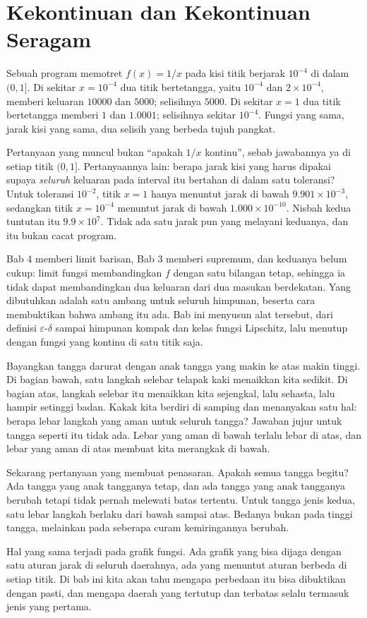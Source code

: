 \chapter{Kekontinuan dan Kekontinuan Seragam}

Sebuah program memotret $f(x)=1/x$ pada kisi titik berjarak $10^{-4}$ di dalam
$(0,1]$. Di sekitar $x=10^{-4}$ dua titik bertetangga, yaitu $10^{-4}$ dan
$2\times 10^{-4}$, memberi keluaran $10000$ dan $5000$; selisihnya $5000$. Di sekitar
$x=1$ dua titik bertetangga memberi $1$ dan $1.0001$; selisihnya sekitar $10^{-4}$.
Fungsi yang sama, jarak kisi yang sama, dua selisih yang berbeda tujuh pangkat.

Pertanyaan yang muncul bukan ``apakah $1/x$ kontinu'', sebab jawabannya ya di setiap
titik $(0,1]$. Pertanyaannya lain: berapa jarak kisi yang harus dipakai supaya
\emph{seluruh} keluaran pada interval itu bertahan di dalam satu toleransi? Untuk
toleransi $10^{-2}$, titik $x=1$ hanya menuntut jarak di bawah
$9.901\times 10^{-3}$, sedangkan titik $x=10^{-4}$ menuntut jarak di bawah
$1.000\times 10^{-10}$. Nisbah kedua tuntutan itu $9.9\times 10^{7}$. Tidak ada satu
jarak pun yang melayani keduanya, dan itu bukan cacat program.

Bab 4 memberi limit barisan, Bab 3 memberi supremum, dan keduanya belum cukup: limit
fungsi membandingkan $f$ dengan satu bilangan tetap, sehingga ia tidak dapat
membandingkan dua keluaran dari dua masukan berdekatan. Yang dibutuhkan adalah satu
ambang untuk seluruh himpunan, beserta cara membuktikan bahwa ambang itu ada. Bab ini
menyusun alat tersebut, dari definisi $\varepsilon$-$\delta$ sampai himpunan kompak dan
kelas fungsi Lipschitz, lalu menutup dengan fungsi yang kontinu di satu titik saja.

\begin{untukanak}
Bayangkan tangga darurat dengan anak tangga yang makin ke atas makin tinggi. Di
bagian bawah, satu langkah selebar telapak kaki menaikkan kita sedikit. Di bagian
atas, langkah selebar itu menaikkan kita sejengkal, lalu sehasta, lalu hampir
setinggi badan. Kakak kita berdiri di samping dan menanyakan satu hal: berapa lebar
langkah yang aman untuk seluruh tangga? Jawaban jujur untuk tangga seperti itu tidak
ada. Lebar yang aman di bawah terlalu lebar di atas, dan lebar yang aman di atas
membuat kita merangkak di bawah.

Sekarang pertanyaan yang membuat penasaran. Apakah semua tangga begitu? Ada tangga
yang anak tangganya tetap, dan ada tangga yang anak tangganya berubah tetapi tidak
pernah melewati batas tertentu. Untuk tangga jenis kedua, satu lebar langkah berlaku
dari bawah sampai atas. Bedanya bukan pada tinggi tangga, melainkan pada seberapa
curam kemiringannya berubah.

Hal yang sama terjadi pada grafik fungsi. Ada grafik yang bisa dijaga dengan satu
aturan jarak di seluruh daerahnya, ada yang menuntut aturan berbeda di setiap titik.
Di bab ini kita akan tahu mengapa perbedaan itu bisa dibuktikan dengan pasti, dan
mengapa daerah yang tertutup dan terbatas selalu termasuk jenis yang pertama.
\end{untukanak}

